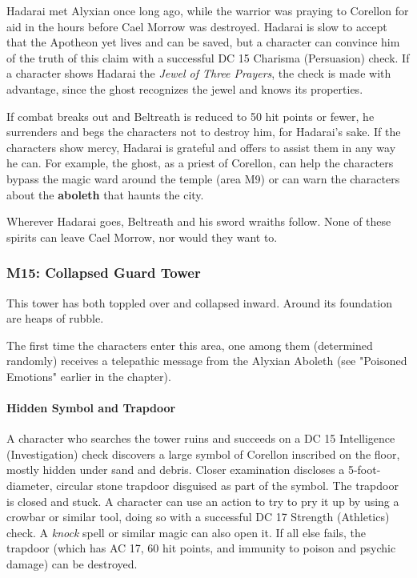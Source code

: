 \documentclass[a4paper, 11pt, bg=full, twocolumn, nooutline]{dndbook}
\begin{document}
Hadarai met Alyxian once long ago, while the warrior was praying to Corellon for aid in the hours before Cael Morrow was destroyed. Hadarai is slow to accept that the Apotheon yet lives and can be saved, but a character can convince him of the truth of this claim with a successful DC 15 Charisma (Persuasion) check. If a character shows Hadarai the \textit{Jewel of Three Prayers}, the check is made with advantage, since the ghost recognizes the jewel and knows its properties.

If combat breaks out and Beltreath is reduced to 50 hit points or fewer, he surrenders and begs the characters not to destroy him, for Hadarai's sake. If the characters show mercy, Hadarai is grateful and offers to assist them in any way he can. For example, the ghost, as a priest of Corellon, can help the characters bypass the magic ward around the temple (area M9) or can warn the characters about the \textbf{aboleth} that haunts the city.

Wherever Hadarai goes, Beltreath and his sword wraiths follow. None of these spirits can leave Cael Morrow, nor would they want to.

\subsubsection{M15: Collapsed Guard Tower}

\begin{DndReadAloud}
This tower has both toppled over and collapsed inward. Around its foundation are heaps of rubble.
\end{DndReadAloud}

The first time the characters enter this area, one among them (determined randomly) receives a telepathic message from the Alyxian Aboleth (see "Poisoned Emotions" earlier in the chapter).

\paragraph{Hidden Symbol and Trapdoor}

A character who searches the tower ruins and succeeds on a DC 15 Intelligence (Investigation) check discovers a large symbol of Corellon inscribed on the floor, mostly hidden under sand and debris. Closer examination discloses a 5-foot-diameter, circular stone trapdoor disguised as part of the symbol. The trapdoor is closed and stuck. A character can use an action to try to pry it up by using a crowbar or similar tool, doing so with a successful DC 17 Strength (Athletics) check. A \textit{knock} spell or similar magic can also open it. If all else fails, the trapdoor (which has AC 17, 60 hit points, and immunity to poison and psychic damage) can be destroyed.
\end{document}
